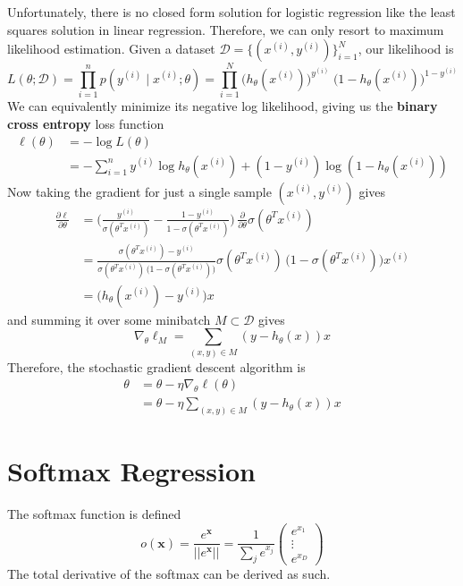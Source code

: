 \documentclass{article}
\theoremstyle{definition}
\theoremstyle{remark}
\theoremstyle{definition}
\begin{document}
Unfortunately, there is no closed form solution for logistic regression like the least squares solution in linear regression. Therefore, we can only resort to maximum likelihood estimation. Given a dataset $\mathcal{D} = \{(x^{(i)}, y^{(i)})\}_{i=1}^N$, our likelihood is 
\[L(\theta ; \mathcal{D}) = \prod_{i=1}^n p(y^{(i)} \;|\; x^{(i)} ; \theta) = \prod_{i=1}^N  \big( h_\theta (x^{(i)} )\big)^{y^{(i)}} \; \big( 1 - h_\theta (x^{(i)})\big)^{1-y^{(i)}}\]
We can equivalently minimize its negative log likelihood, giving us the \textbf{binary cross entropy} loss function
\begin{align*}
    \ell(\theta) & = -\log L(\theta) \\
    & = -\sum_{i=1}^n y^{(i)} \log h_\theta (x^{(i)}) + (1 - y^{(i)}) \log (1 - h_\theta (x^{(i)}))
\end{align*}
Now taking the gradient for just a single sample $(x^{(i)}, y^{(i)})$ gives 
\begin{align*}
    \frac{\partial \ell}{\partial \theta}  & = \bigg( \frac{y^{(i)}}{\sigma(\theta^T x^{(i)})} - \frac{1 - y^{(i)}}{1 - \sigma(\theta^T x^{(i)})} \bigg) \, \frac{\partial}{\partial \theta} \sigma (\theta^T x^{(i)}) \\
    & = \frac{\sigma(\theta^T x^{(i)}) - y^{(i)}}{\sigma(\theta^T x^{(i)}) \, \big( 1 - \sigma(\theta^T x^{(i)}) \big)} \sigma(\theta^T x^{(i)}) \, \big( 1 - \sigma(\theta^T x^{(i)}) \big) x^{(i)} \\
    & = \big( h_\theta (x^{(i)}) - y^{(i)} \big) x
\end{align*}
and summing it over some minibatch $M \subset \mathcal{D}$ gives 
\[\nabla_\theta \ell_M = \sum_{(x, y) \in M} (y - h_\theta(x)) x\]
Therefore, the stochastic gradient descent algorithm is 
\begin{align*}
    \theta & = \theta - \eta \nabla_\theta \ell (\theta) \\
    & = \theta - \eta \sum_{(x, y) \in M} (y - h_\theta(x)) x
\end{align*}

\section{Softmax Regression}

The softmax function is defined 
\[o(\mathbf{x}) = \frac{e^{\mathbf{x}}}{||e^{\mathbf{x}}||} = \frac{1}{\sum_j e^{x_j}}\begin{pmatrix} e^{x_1} \\ \vdots \\ e^{x_D} \end{pmatrix}\]
The total derivative of the softmax can be derived as such. 
\end{document}
